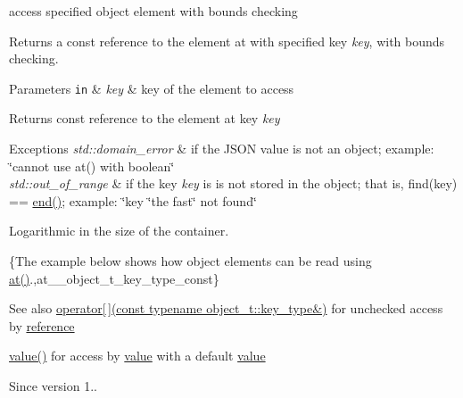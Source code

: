 access specified object element with bounds checking 

Returns a const reference to the element at with specified key {\itshape key}, with bounds checking.


\begin{DoxyParams}[1]{Parameters}
\mbox{\tt in}  & {\em key} & key of the element to access\\
\hline
\end{DoxyParams}
\begin{DoxyReturn}{Returns}
const reference to the element at key {\itshape key} 
\end{DoxyReturn}

\begin{DoxyExceptions}{Exceptions}
{\em std\+::domain\+\_\+error} & if the J\+S\+ON value is not an object; example\+: {\ttfamily \char`\"{}cannot use at() with boolean\char`\"{}} \\
\hline
{\em std\+::out\+\_\+of\+\_\+range} & if the key {\itshape key} is is not stored in the object; that is, {\ttfamily find(key) == \hyperlink{a00025_a12ccf14d39ddae52f6c7e126105a230b}{end()}}; example\+: {\ttfamily \char`\"{}key \char`\"{}the fast\char`\"{} not found\char`\"{}}\\
\hline
\end{DoxyExceptions}
Logarithmic in the size of the container.

\{The example below shows how object elements can be read using {\ttfamily \hyperlink{a00025_a214a8c22d616fd3567b88932c07436c9}{at()}}.,at\+\_\+\+\_\+object\+\_\+t\+\_\+key\+\_\+type\+\_\+const\}

\begin{DoxySeeAlso}{See also}
\hyperlink{a00025_a92fbb711a36b5ce78ee228b26787c034}{operator\mbox{[}$\,$\mbox{]}(const typename object\+\_\+t\+::key\+\_\+type\&)} for unchecked access by \hyperlink{a00025_a3ec8e17be8732fe436e9d6733f52b7a3}{reference} 

\hyperlink{a00025_a0a2cbbd95862a623e7dc5c37e67dead0}{value()} for access by \hyperlink{a00025_a0a2cbbd95862a623e7dc5c37e67dead0}{value} with a default \hyperlink{a00025_a0a2cbbd95862a623e7dc5c37e67dead0}{value}
\end{DoxySeeAlso}
\begin{DoxySince}{Since}
version 1.. 
\end{DoxySince}
